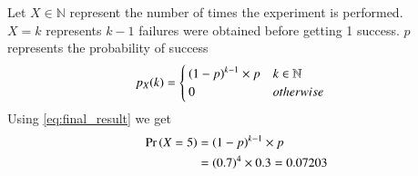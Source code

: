 Let $X\in\mathbb{N}$ represent the number of times the experiment is performed. \\
$X=k$ represents $k-1$ failures were obtained before getting 1 success. $p$ represents the probability of success
\begin{align}
	p_X(k) &=
\begin{cases}
\brak{1-p}^{k-1}\times p & k\in \mathbb{N}\\
0 &  otherwise 
\end{cases}
\label{eq:final_result}
\end{align}
Using \eqref{eq:final_result} we get
\begin{align}
\Pr\left(X=5\right)&=\left(1-p\right)^{k-1}\times p\nonumber\\
&=\left(0.7\right)^4\times 0.3=0.07203
\end{align}